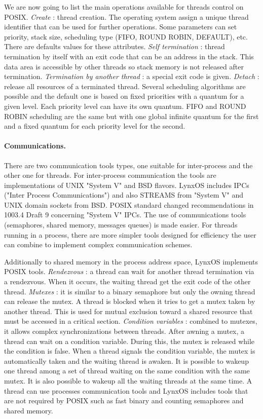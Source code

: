 \documentclass[10pt]{report}
\begin{document}
We are now going to list the main operations available for threads control on POSIX. {\em Create} : thread creation. The operating
system assign a unique thread identifier that can be used for further operations. Some parameters can set priority, stack size,
scheduling type (FIFO, ROUND ROBIN, DEFAULT), etc. There are defaults values for these attributes. {\em Self termination} :
thread termination by itself with an exit code that can be an address in the stack. This data area is accessible by other
threads so stack memory is not released after termination. {\em Termination by another thread} : a special exit code is given.
{\em Detach } : release all resources of a terminated thread. Several scheduling algorithms are possible and the default one
is based on fixed priorities with a quantum for a given level. Each priority level can have its own quantum. FIFO and ROUND ROBIN
scheduling are the same but with one global infinite quantum for the first and a fixed quantum for each priority level for the
second.

\paragraph{Communications.} There are two communication tools types, one suitable for inter-process and the other one for threads.
For inter-process communication the tools are implementations of UNIX "System V" and BSD flavors. LynxOS includes IPCs ("Inter
Process Communications") and also STREAMS from "System V" and UNIX domain sockets from BSD. POSIX standard changed recommendations
in 1003.4 Draft 9 concerning "System V" IPCs. The use of communications tools (semaphores, shared memory, messages queues) is made
easier. For threads running in a process, there are more simpler tools designed for efficiency the user can combine to
implement complex communication schemes.

Additionally to shared memory in the process address space, LynxOS implements POSIX tools. {\em Rendezvous} : a thread can wait
for another thread termination via a rendezvous. When it occurs, the waiting thread get the exit code of the other thread.
{\em Mutexes} : it is similar to a binary semaphore but only the owning thread can release the mutex. A thread is blocked when
it tries to get a mutex taken by another thread. This is used for mutual exclusion toward a shared resource that must be
accessed in a critical section. {\em Condition variables} : combined to mutexes, it allows complex synchronizations between
threads. After awning a mutex, a thread can wait on a condition variable. During this, the mutex is released while the condition
is false. When a thread signals the condition variable, the mutex is automatically taken and the waiting thread is awaken. It
is possible to wakeup one thread among a set of thread waiting on the same condition with the same mutex. It is also possible
to wakeup all the waiting threads at the same time. A thread can use processes communication tools and LynxOS includes tools that
are not required by POSIX such as fast binary and counting semaphores and shared memory.
\end{document}
